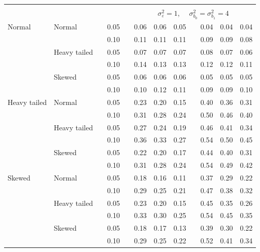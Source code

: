 \documentclass[12pt]{article} %
\begin{document}
\begin{table}[ht]
\begin{scriptsize}
\begin{center}
\begin{tabular}{ll p{.1cm} c p{.1cm} rrr p{.1cm} rrr}
&&&&&&&&&&&\\
& && && \multicolumn{7}{c}{$\sigma_{\varepsilon}^2 = 1$, \ \ $\sigma_{b_0}^2 = \sigma_{b_1}^2 = 4$} \\ \cline{6-12}
Normal       & Normal       && 0.05 &&  0.06 & 0.06 & 0.05 && 0.04 & 0.04 & 0.04 \\ 
             &              && 0.10 &&  0.11 & 0.11 & 0.11 && 0.09 & 0.09 & 0.08 \\ 
             & Heavy tailed && 0.05 &&  0.07 & 0.07 & 0.07 && 0.08 & 0.07 & 0.06 \\ 
             &              && 0.10 &&  0.14 & 0.13 & 0.13 && 0.12 & 0.12 & 0.11 \\ 
             & Skewed       && 0.05 &&  0.06 & 0.06 & 0.06 && 0.05 & 0.05 & 0.05 \\ 
             &              && 0.10 &&  0.10 & 0.12 & 0.11 && 0.09 & 0.09 & 0.10 \\ 
Heavy tailed & Normal       && 0.05 &&  0.23 & 0.20 & 0.15 && 0.40 & 0.36 & 0.31 \\ 
             &              && 0.10 &&  0.31 & 0.28 & 0.24 && 0.50 & 0.46 & 0.40 \\ 
             & Heavy tailed && 0.05 &&  0.27 & 0.24 & 0.19 && 0.46 & 0.41 & 0.34 \\ 
             &              && 0.10 &&  0.36 & 0.33 & 0.27 && 0.54 & 0.50 & 0.45 \\ 
             & Skewed       && 0.05 &&  0.22 & 0.20 & 0.17 && 0.44 & 0.40 & 0.31 \\ 
             &              && 0.10 &&  0.31 & 0.28 & 0.24 && 0.54 & 0.49 & 0.42 \\ 
Skewed       & Normal       && 0.05 &&  0.18 & 0.16 & 0.11 && 0.37 & 0.29 & 0.22 \\ 
             &              && 0.10 &&  0.29 & 0.25 & 0.21 && 0.47 & 0.38 & 0.32 \\ 
             & Heavy tailed && 0.05 &&  0.23 & 0.20 & 0.15 && 0.45 & 0.35 & 0.26 \\ 
             &              && 0.10 &&  0.33 & 0.30 & 0.25 && 0.54 & 0.45 & 0.35 \\ 
             & Skewed       && 0.05 &&  0.18 & 0.17 & 0.13 && 0.39 & 0.30 & 0.22 \\ 
             &              && 0.10 &&  0.29 & 0.25 & 0.22 && 0.52 & 0.41 & 0.34 \\ 


\hline
\end{tabular}
\end{center}
\end{scriptsize}
\end{table}
\end{document}
